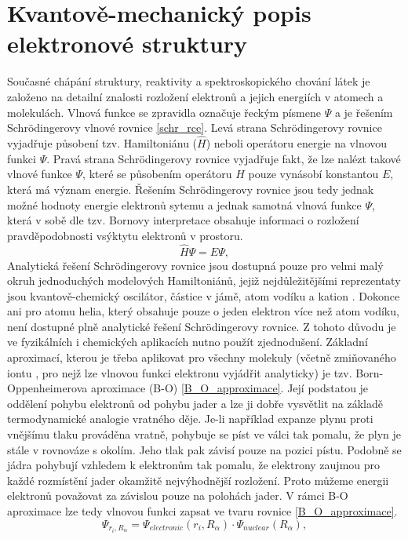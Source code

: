 \documentclass[
  digital, %
  table,   %
  lof,     %
  lot,     %
  oneside,
]{fithesis3}
\begin{document}
\section{Kvantově-mechanický popis elektronové struktury}
Současné chápání struktury, reaktivity a spektroskopického chování látek je založeno na detailní znalosti rozložení elektronů a jejich energiích v atomech a molekulách. Vlnová funkce se zpravidla označuje řeckým písmene $\Psi$ a je řešením Schrödingerovy vlnové rovnice \ref{schr_rce}. Levá strana Schrödingerovy rovnice vyjadřuje působení tzv. Hamiltoniánu ($\widehat{H}$) neboli operátoru energie na vlnovou funkci $\Psi$. Pravá strana Schrödingerovy rovnice vyjadřuje fakt, že lze nalézt takové vlnové funkce $\Psi$, které se působením operátoru $\widehat{H}$ pouze vynásobí konstantou $E$, která má význam energie. Řešením Schrödingerovy rovnice jsou tedy jednak možné hodnoty energie elektronů sytemu a jednak samotná vlnová funkce $\Psi$, která v sobě dle tzv. Bornovy interpretace obsahuje informaci o rozložení pravděpodobnosti vsýktytu elektronů v prostoru.
\begin{equation}
\widehat{H} \Psi = E \Psi,
\label{schr_rce}
\end{equation}
Analytická řešení Schrödingerovy rovnice jsou dostupná pouze pro velmi malý okruh jednoduchých modelových Hamiltoniánů, jejiž nejdůležitějšími reprezentaty jsou kvantově-chemický oscilátor, částice v jámě, atom vodíku a kation . Dokonce ani pro atomu helia, který obsahuje pouze o jeden elektron více než atom vodíku, není dostupné plně analytické řešení Schrödingerovy rovnice.
Z tohoto důvodu je ve fyzikálních i chemických aplikacích nutno použít zjednodušení. Základní aproximací, kterou je třeba aplikovat pro všechny molekuly (včetně zmiňovaného iontu , pro nejž lze vlnovou funkci elektronu vyjádřit analyticky) je tzv. Born-Oppenheimerova aproximace (B-O) \ref{B_O_approximace}.
Její podstatou je oddělení pohybu elektronů od pohybu jader a lze ji dobře vysvětlit na základě termodynamické analogie vratného děje. Je-li například expanze plynu proti vnějšímu tlaku prováděna vratně, pohybuje se píst ve válci tak pomalu, že plyn je stále v rovnováze s okolím. Jeho tlak pak závisí pouze na pozici pístu. Podobně se jádra pohybují vzhledem k elektronům tak pomalu, že elektrony zaujmou pro každé rozmístění jader okamžitě nejvýhodnější rozložení. Proto můžeme energii elektronů považovat za závislou pouze na polohách jader. V rámci B-O aproximace lze tedy vlnovou funkci zapsat ve tvaru rovnice \ref{B_O_approximace}.
\begin{equation}
  \Psi_{r_i,R_{\alpha}} = \Psi_{electronic}(r_i,R_{\alpha}) \cdot \Psi_{nuclear}(R_{\alpha}),
  \label{B_O_approximace}
\end{equation}
\end{document}
